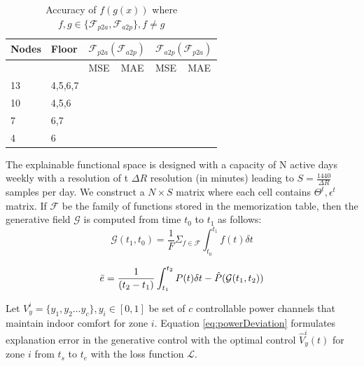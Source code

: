 \begin{table}[]
\begin{tabular}{|l|l|l|l|l|l|}
\hline
Nodes     & Floor      & \multicolumn{2}{l|}{$\mathcal{F}_{p2a}(\mathcal{F}_{a2p})$ } & \multicolumn{2}{l|}{$\mathcal{F}_{a2p}(\mathcal{F}_{p2a})$  } \\ \hline
\multicolumn{2}{|l|}{} & MSE           & MAE          & MSE           & MAE          \\ \hline
13        & 4,5,6,7    &               &              &               &              \\ \hline
10        & 4,5,6      &               &              &               &              \\ \hline
7         & 6,7        &               &              &               &              \\ \hline
4         & 6          &               &              &               &              \\ \hline
\end{tabular}
\caption{Accuracy of $f(g(x))$ where $f,g \in \{\mathcal{F}_{p2a}, \mathcal{F}_{a2p} \}, f \neq g$ }
\label{table:compositeTranslators}
\end{table}


The explainable functional space is designed with a capacity of N active days weekly with a resolution of t $\Delta R$ resolution (in minutes) leading to $ S = \frac{1440}{\Delta R} $ samples per day.
We construct a $N \times S$ matrix where each cell contains $ \Theta^t, \epsilon^t $ matrix.
If $ \mathcal{F} $ be the family of functions stored in the memorization table, then the generative field $\mathcal{G}$ is computed from time $t_0$ to $t_1$ as follows:
\begin{equation}
\mathcal{G}(t_1, t_0) = \frac{1}{F} \Sigma_{f \in \mathcal{F}} \int_{t_0}^{t_1} f(t) \delta t 
\end{equation}


\begin{equation}
\Bar{e} = \frac{1}{(t_2-t_1)} \int_{t_1}^{t_2} P(t) \delta t  - \hat{P}(\mathcal{G}(t_1, t_2) ) 
\end{equation}

  
Let $V^i_y = \{y_1, y_2 \dots y_c \}, y_i \in [0,1] $ be set of $c$ controllable power channels that maintain indoor comfort for zone $i$. 
Equation \ref{eq:powerDeviation} formulates explanation error in the generative control with the optimal control $\hat{V}^i_y (t)$ for zone $i$ from $t_s$ to $t_e$ with the loss function $\mathcal{L}$.



